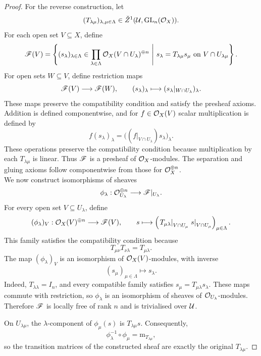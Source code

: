 \documentclass[12pt,a4paper]{article}
\begin{document}
\begin{proof}
    For the reverse construction, let
    \[
        (T_{\lambda\mu})_{\lambda,\mu\in\Lambda}
        \in\check Z^1(\mathcal{U},\operatorname{GL}_n(\mathcal{O}_X)).
    \]
    For each open set $V\subseteq X$, define
    \begin{equation}
        \mathscr{F}(V)=
        \left\{
            (s_\lambda)_{\lambda\in\Lambda}
            \in
            \prod_{\lambda\in\Lambda}
            \mathcal{O}_X(V\cap U_\lambda)^{\oplus n}
            \ \middle|\
            s_\lambda=T_{\lambda\mu}s_\mu
            \text{ on }V\cap U_{\lambda\mu}
        \right\}.
    \end{equation}
    For open sets $W\subseteq V$, define restriction maps
    \[
        \mathscr{F}(V)\longrightarrow\mathscr{F}(W),
        \qquad
        (s_\lambda)_\lambda
        \longmapsto
        (s_\lambda|_{W\cap U_\lambda})_\lambda.
    \]
    These maps preserve the compatibility condition and satisfy the presheaf axioms. Addition is defined componentwise, and for
    $f\in\mathcal{O}_X(V)$ scalar multiplication is defined by
    \[
        f(s_\lambda)_\lambda
        =
        \bigl((f|_{V\cap U_\lambda})s_\lambda\bigr)_\lambda.
    \]
    These operations preserve the compatibility condition because multiplication by each $T_{\lambda\mu}$ is linear.
    Thus $\mathscr{F}$ is a presheaf of $\mathcal{O}_X$-modules. The separation and gluing axioms follow componentwise from those for $\mathcal{O}_X^{\oplus n}$.\\

    We now construct isomorphisms of sheaves
    \[
        \phi_\lambda:
        \mathcal{O}_{U_\lambda}^{\oplus n}
        \longrightarrow\mathscr{F}|_{U_\lambda}.
    \]
    For every open set $V\subseteq U_\lambda$, define
    \[
        (\phi_\lambda)_V:
        \mathcal{O}_X(V)^{\oplus n}\longrightarrow\mathscr{F}(V),
        \qquad
        s\longmapsto
        \left(
            \left.T_{\mu\lambda}\right|_{V\cap U_\mu}
            \left.s\right|_{V\cap U_\mu}
        \right)_{\mu\in\Lambda}.
    \]
    This family satisfies the compatibility condition because
    \[
        T_{\mu\nu}T_{\nu\lambda}=T_{\mu\lambda}.
    \]
    The map $(\phi_\lambda)_V$ is an isomorphism of
    $\mathcal{O}_X(V)$-modules, with inverse
    \[
        (s_\mu)_{\mu\in\Lambda}\longmapsto s_\lambda.
    \]
    Indeed, $T_{\lambda\lambda}=I_n$, and every compatible family satisfies $s_\mu=T_{\mu\lambda}s_\lambda$. These maps commute with restriction, so $\phi_\lambda$
    is an isomorphism of sheaves of $\mathcal{O}_{U_\lambda}$-modules.
    Therefore $\mathscr{F}$ is locally free of rank $n$ and is
    trivialised over $\mathcal{U}$.

    On $U_{\lambda\mu}$, the $\lambda$-component of
    $\phi_\mu(s)$ is $T_{\lambda\mu}s$. Consequently,
    \[
        \phi_\lambda^{-1}\circ\phi_\mu
        =
        \mathrm m_{T_{\lambda\mu}},
    \]
    so the transition matrices of the constructed sheaf
    are exactly the original $T_{\lambda\mu}$.


\end{proof}
\end{document}
